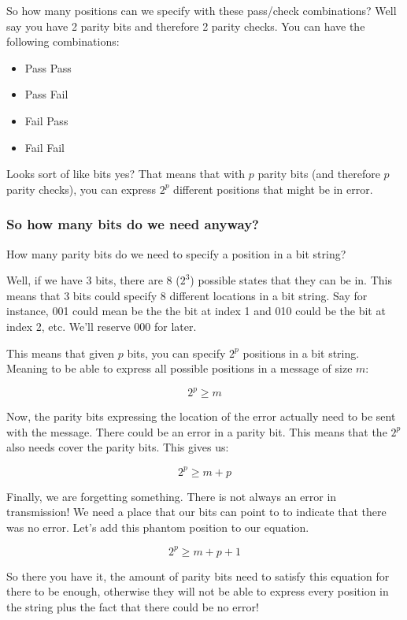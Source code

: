 \documentclass{article}
\begin{document}
  So how many positions can we specify with these pass/check combinations? Well say you have 2 parity bits and therefore 2 parity checks. You can have the following combinations:

  \begin{itemize}
    \item Pass Pass
    \item Pass Fail
    \item Fail Pass
    \item Fail Fail
  \end{itemize}

  Looks sort of like bits yes? That means that with $p$ parity bits (and therefore $p$ parity checks), you can express $2^p$ different positions that might be in error.

  \subsubsection*{So how many bits do we need anyway?}
  How many parity bits do we need to specify a position in a bit string?

  Well, if we have 3 bits, there are 8 ($2^3$) possible states that they can be in. This means that 3 bits could specify 8 different locations in a bit string. Say for instance, 001 could mean be the the bit at index 1 and 010 could be the bit at index 2, etc. We'll reserve 000 for later.

  This means that given $p$ bits, you can specify $2^p$ positions in a bit string. Meaning to be able to express all possible positions in a message of size $m$:

  \[ 2^p \geq m \]

  Now, the parity bits expressing the location of the error actually need to be sent with the message. There could be an error in a parity bit. This means that the $2^p$ also needs cover the parity bits. This gives us:

  \[ 2^p \geq m + p \]

  Finally, we are forgetting something. There is not always an error in transmission! We need a place that our bits can point to to indicate that there was no error. Let's add this phantom position to our equation.

  \[ 2^p \geq m + p + 1 \]

  So there you have it, the amount of parity bits need to satisfy this equation for there to be enough, otherwise they will not be able to express every position in the string plus the fact that there could be no error!
\end{document}
